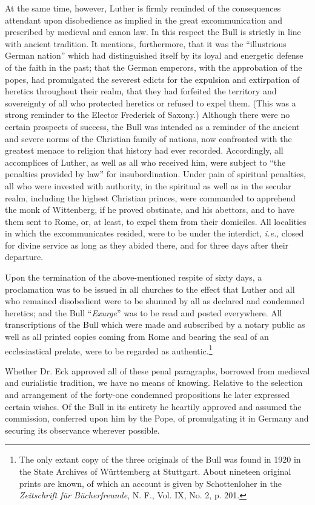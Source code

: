 At the same time, however, Luther is firmly reminded of the consequences
attendant upon disobedience as implied in the great excommunication and
prescribed by medieval and canon law. In this respect the Bull is strictly in
line with ancient tradition. It mentions, furthermore, that it was the “illustrious
German nation” which had distinguished itself by its loyal and
energetic defense of the faith in the past; that the German emperors, with
the approbation of the popes, had promulgated the severest edicts for the
expulsion and extirpation of heretics throughout their realm, that they had
forfeited the territory and sovereignty of all who protected heretics or refused
to expel them. (This was a strong reminder to the Elector Frederick
of Saxony.) Although there were no certain prospects of success, the
Bull was intended as a reminder of the ancient and severe norms of the
Christian family of nations, now confronted with the greatest menace to
religion that history had ever recorded. Accordingly, all accomplices of
Luther, as well as all who received him, were subject to “the penalties
provided by law” for insubordination. Under pain of spiritual penalties, all
who were invested with authority, in the spiritual as well as in the secular
realm, including the highest Christian princes, were commanded to apprehend
the monk of Wittenberg, if he proved obstinate, and his abettors, and
to have them sent to Rome, or, at least, to expel them from their domiciles.
All localities in which the excommunicates resided, were to be under the
interdict, \textit{i.e.}, closed for divine service as long as they abided there, and
for three days after their departure.

Upon the termination of the above-mentioned respite of sixty days, a
proclamation was to be issued in all churches to the effect that Luther and
all who remained disobedient were to be shunned by all as declared and
condemned heretics; and the Bull “\textit{Exurge}” was to be read and posted
everywhere. All transcriptions of the Bull which were made and subscribed by a
notary public as well as all printed copies coming from Rome and bearing
the seal of an ecclesiastical prelate, were to be regarded as authentic.\footnote
{The only extant copy of the three originals of the Bull was found in 1920 in the State
Archives of Württemberg at Stuttgart. About nineteen original prints are known, of which
an account is given by Schottenloher in the \textit{Zeitschrift für Bücherfreunde}, N. F., Vol. IX,
No. 2, p. 201.}

Whether Dr. Eck approved all of these penal paragraphs, borrowed from medieval
and curialistic tradition, we have no means of
knowing. Relative to the selection and arrangement of the forty-one
condemned propositions he later expressed certain wishes. Of the Bull
in its entirety he heartily approved and assumed the commission, conferred upon him by the Pope, of promulgating it in Germany and
securing its observance wherever possible.

